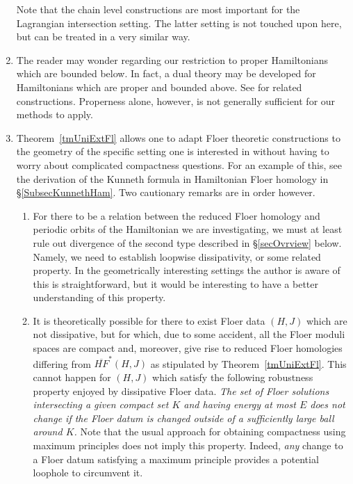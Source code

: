 \documentclass[11pt]{amsart}
\theoremstyle{definition}
\theoremstyle{remark}
\begin{document}
\begin{enumerate}[wide, labelwidth=!, labelindent=10pt]

Note that the chain level constructions are most important for the Lagrangian intersection setting. The latter setting is not touched upon here, but can be treated in a very similar way.
\item The reader may wonder regarding our restriction to proper Hamiltonians which are bounded below. In fact, a dual theory may be developed for Hamiltonians which are proper and bounded above. See \cite{Venkatesh2017} for related constructions. Properness alone, however, is not generally sufficient for our methods to apply.
\item \label{comments7}Theorem~\ref{tmUniExtFl} allows one to adapt Floer theoretic constructions to the geometry of the specific setting one is interested in without having to worry about complicated compactness questions. For an example of this, see the  derivation of the Kunneth formula in Hamiltonian Floer homology in \S\ref{SubsecKunnethHam}. Two cautionary remarks are in order however.
\begin{enumerate}[wide, labelwidth=!, labelindent=10pt]
\item For there to be a relation between the reduced Floer homology and periodic orbits of the Hamiltonian we are investigating, we must at least rule out divergence of the second type described in \S\ref{secOvrview} below. Namely, we need to establish loopwise dissipativity, or some related property. In the geometrically interesting settings the author is aware of this is straightforward, but it would be interesting to have a better understanding of this property.
\item It is theoretically possible for there to exist Floer data $(H,J)$ which are not dissipative, but for which, due to some accident, all the Floer moduli spaces are compact and, moreover, give rise to reduced Floer homologies differing from $\overline{HF}^*(H,J)$ as stipulated by Theorem~\ref{tmUniExtFl}. This cannot happen for $(H,J)$ which satisfy the following robustness property enjoyed by dissipative Floer data. \textit{\label{prop}The set of Floer solutions intersecting a given compact set $K$ and having energy at most $E$ does not change if the Floer datum is changed outside of a sufficiently large ball around $K$.} Note that the usual approach for obtaining compactness using maximum principles does not imply this property. Indeed, \textit{any} change to a Floer datum satisfying a maximum principle provides a potential loophole to circumvent it.
    \end{enumerate}
\end{enumerate}
\end{document}
